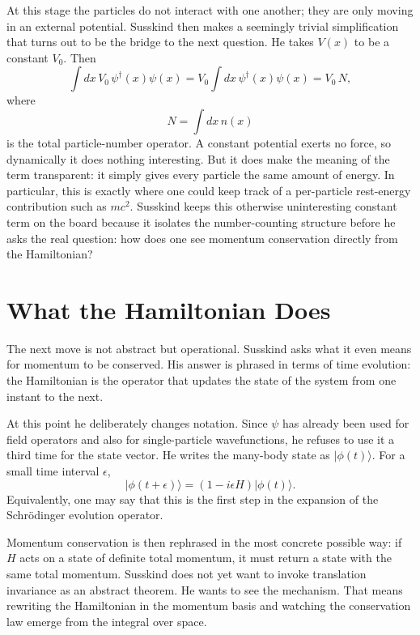 At this stage the particles do not interact with one another; they are only moving in an external potential. Susskind then makes a seemingly trivial simplification that turns out to be the bridge to the next question. He takes \(V(x)\) to be a constant \(V_0\). Then
\begin{equation}
\int dx\,V_0\,\psi^\dagger(x)\psi(x)=V_0\int dx\,\psi^\dagger(x)\psi(x)=V_0\,N,
\end{equation}
where
\begin{equation}
N=\int dx\,n(x)
\end{equation}
is the total particle-number operator. A constant potential exerts no force, so dynamically it does nothing interesting. But it does make the meaning of the term transparent: it simply gives every particle the same amount of energy. In particular, this is exactly where one could keep track of a per-particle rest-energy contribution such as \(mc^2\). Susskind keeps this otherwise uninteresting constant term on the board because it isolates the number-counting structure before he asks the real question: how does one see momentum conservation directly from the Hamiltonian?

\section{What the Hamiltonian Does}

The next move is not abstract but operational. Susskind asks what it even means for momentum to be conserved. His answer is phrased in terms of time evolution: the Hamiltonian is the operator that updates the state of the system from one instant to the next.

At this point he deliberately changes notation. Since \(\psi\) has already been used for field operators and also for single-particle wavefunctions, he refuses to use it a third time for the state vector. He writes the many-body state as \(|\phi(t)\rangle\). For a small time interval \(\epsilon\),
\begin{equation}
|\phi(t+\epsilon)\rangle=(1-i\epsilon H)|\phi(t)\rangle.
\end{equation}
Equivalently, one may say that this is the first step in the expansion of the Schr\"odinger evolution operator.

Momentum conservation is then rephrased in the most concrete possible way: if \(H\) acts on a state of definite total momentum, it must return a state with the same total momentum. Susskind does not yet want to invoke translation invariance as an abstract theorem. He wants to see the mechanism. That means rewriting the Hamiltonian in the momentum basis and watching the conservation law emerge from the integral over space.

